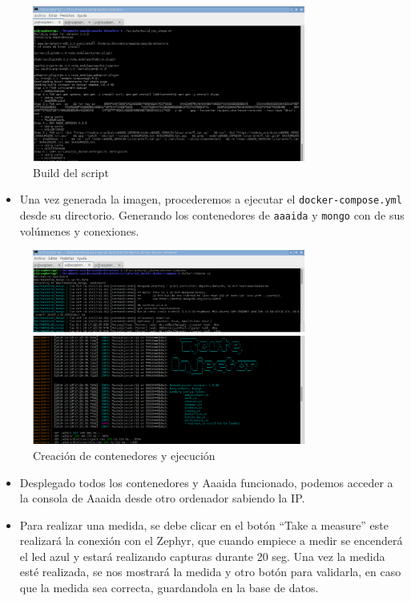 \begin{figure}[htb]
\begin{center}
\includegraphics[width=0.80\textwidth]{./setup/buildScript}
\caption{Build del script}
\end{center}
\end{figure}

\begin{itemize}
\item Una vez generada la imagen, procederemos a ejecutar el \texttt{docker-compose.yml} desde su directorio. Generando los contenedores de \texttt{aaaida} y \texttt{mongo} con de sus volúmenes y conexiones.  
\end{itemize}

\begin{figure}[htb]
\begin{center}
\includegraphics[width=0.80\textwidth]{./setup/Up2}
\caption{Creación de contenedores y ejecución}
\end{center}
\end{figure}

\begin{itemize}
\item Desplegado todos los contenedores y Aaaida funcionado, podemos acceder a la consola de Aaaida desde otro ordenador sabiendo la IP. 
\pagebreak
\item Para realizar una medida, se debe clicar en el botón “Take a measure” este realizará la conexión con el Zephyr, que cuando empiece a medir se encenderá el led azul y estará realizando capturas durante 20 seg. Una vez la medida esté realizada, se nos mostrará la medida y otro botón para validarla, en caso que la medida sea correcta, guardandola en la base de datos. 
\end{itemize}


